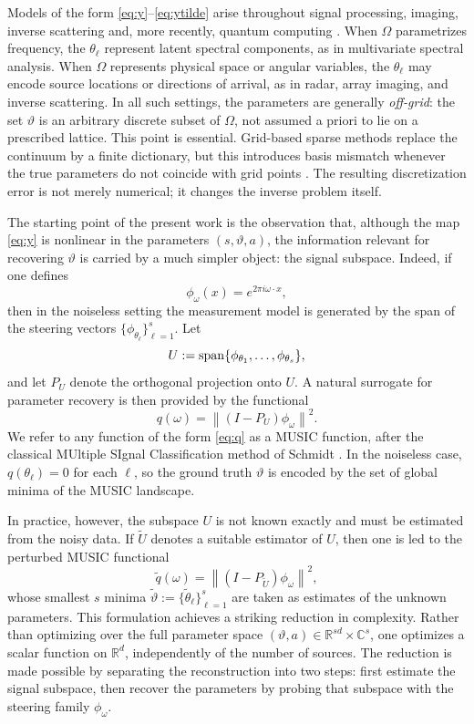 \documentclass[11pt]{article}
\theoremstyle{definition}
\numberwithin{theorem}{section}
\numberwithin{lemma}{section}
\numberwithin{equation}{section}
\def\C{\mathbb{C}}
\def\R{\mathbb{R}}
\renewcommand{\tilde}{\widetilde}
\newcommand{\domain}{\Omega}
\newcommand{\bfa}{a}
\newcommand{\spann}{{\rm span}}
\newcommand{\norm}[1]{{\left\|#1\right\|}}
\numberwithin{equation}{section}
\begin{document}
Models of the form \eqref{eq:y}--\eqref{eq:ytilde} arise throughout signal processing, imaging, inverse scattering and,  more recently, quantum computing \cite{helsen2022general, LinTong2022HeisenbergLimited, Somma2019QuantumEigenvalue,  stroeks2022spectral}. When $\domain$ parametrizes frequency, the $\theta_\ell$ represent latent spectral components, as in multivariate spectral analysis. When $\domain$ represents physical space or angular variables, the $\theta_\ell$ may encode source locations or directions of arrival, as in radar, array imaging, and inverse scattering. In all such settings, the parameters are generally \emph{off-grid}: the set $\vartheta$ is an arbitrary discrete subset of $\domain$, not assumed a priori to lie on a prescribed lattice. This point is essential. Grid-based sparse methods replace the continuum by a finite dictionary, but this introduces basis mismatch whenever the true parameters do not coincide with grid points \cite{fannjiang2012coherence}. The resulting discretization error is not merely numerical; it changes the inverse problem itself.

The starting point of the present work is the observation that, although the map \eqref{eq:y} is nonlinear in the parameters $(s,\vartheta,\bfa)$, the information relevant for recovering $\vartheta$ is carried by a much simpler object: the signal subspace. Indeed, if one defines
\[
\phi_\omega(x)=e^{2\pi i \omega\cdot x},
\]
then in the noiseless setting the measurement model is generated by the span of the steering vectors $\{\phi_{\theta_\ell}\}_{\ell=1}^s$. Let
\[
U:=\spann\{\phi_{\theta_1},\dots,\phi_{\theta_s}\},
\]
and let $P_U$ denote the orthogonal projection onto $U$. A natural surrogate for parameter recovery is then provided by the functional
\begin{equation}
\label{eq:q}
q(\omega)=\norm{(I-P_U)\phi_\omega}^2.
\end{equation}
We refer to any function of the form \eqref{eq:q} as a MUSIC function, after the classical MUltiple SIgnal Classification method of Schmidt \cite{schmidt1986multiple}. In the noiseless case, $q(\theta_\ell)=0$ for each $\ell$, so the ground truth $\vartheta$ is encoded by the set of global minima of the MUSIC landscape.

In practice, however, the subspace $U$ is not known exactly and must be estimated from the noisy data. If $\tilde U$ denotes a suitable estimator of $U$, then one is led to the perturbed MUSIC functional
\begin{equation}
\label{eq:qtilde}
\tilde q(\omega)=\norm{(I-P_{\tilde U})\phi_\omega}^2,
\end{equation}
whose smallest $s$ minima $\tilde\vartheta:=\{\tilde\theta_\ell\}_{\ell=1}^s$ are taken as estimates of the unknown parameters. This formulation achieves a striking reduction in complexity. Rather than optimizing over the full parameter space $(\vartheta,\bfa)\in \R^{sd}\times \C^s$, one optimizes a scalar function on $\R^d$, independently of the number of sources. The reduction is made possible by separating the reconstruction into two steps: first estimate the signal subspace, then recover the parameters by probing that subspace with the steering family $\phi_\omega$.
\end{document}
